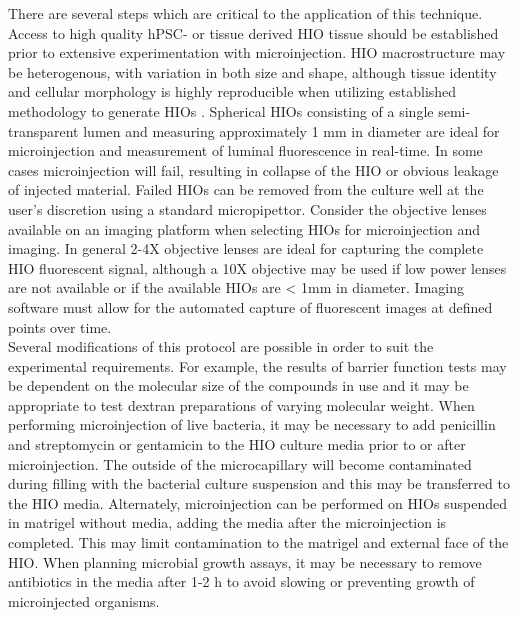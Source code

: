 \documentclass[11pt]{article}
\begin{document}
There are several steps which are critical to the application of this technique. Access to high quality hPSC- or tissue derived HIO tissue should be established prior to extensive experimentation with microinjection. HIO macrostructure may be heterogenous, with variation in both size and shape, although tissue identity and cellular morphology is highly reproducible when utilizing established methodology to generate HIOs \supercite{McCracken:2011}. Spherical HIOs consisting of a single semi-transparent lumen and measuring approximately 1 mm in diameter are ideal for microinjection and measurement of luminal fluorescence in real-time. In some cases microinjection will fail, resulting in collapse of the HIO or obvious leakage of injected material. Failed HIOs can be removed from the culture well at the user's discretion using a standard micropipettor. Consider the objective lenses available on an imaging platform when selecting HIOs for microinjection and imaging. In general 2-4X objective lenses are ideal for capturing the complete HIO fluorescent signal, although a 10X objective may be used if low power lenses are not available or if the available HIOs are < 1mm in diameter. Imaging software must allow for the automated capture of fluorescent images at defined points over time.\\

Several modifications of this protocol are possible in order to suit the experimental requirements. For example, the results of barrier function tests may be dependent on the molecular size of the compounds in use \supercite{Vojdani:2013} and it may be appropriate to test dextran preparations of varying molecular weight. When performing microinjection of live bacteria\supercite{Hill:2017,Leslie:2015,Forbester:2015,Engevik:2015,Engevik:2013,Karve:2017}, it may be necessary to add penicillin and streptomycin or gentamicin to the HIO culture media prior to or after microinjection. The outside of the microcapillary will become contaminated during filling with the bacterial culture suspension and this may be transferred to the HIO media. Alternately, microinjection can be performed on HIOs suspended in matrigel without media, adding the media after the microinjection is completed. This may limit contamination to the matrigel and external face of the HIO. When planning microbial growth assays, it may be necessary to remove antibiotics in the media after 1-2 h to avoid slowing or preventing growth of microinjected organisms.\\
\end{document}
